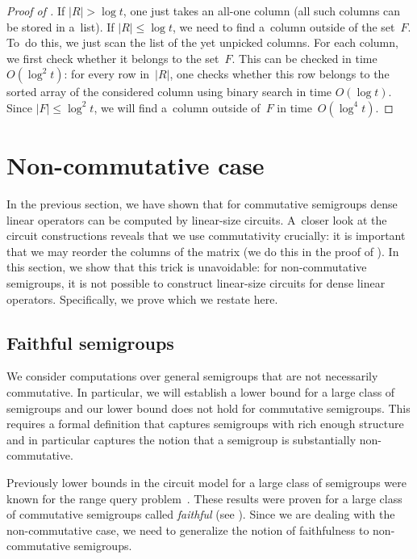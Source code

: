 \documentclass{toc}
\begin{document}
\begin{proof}[Proof of {}]
    If $|R| > \log t$, one just takes an all-one column (all such columns
    can be stored in a~list). If $|R| \le \log t$, we need to find a~column outside
    of the set~$F$. To~do this, we just scan the list of the yet unpicked columns. For
    each column, we first check whether it belongs to the set~$F$. This can be
    checked in time $O(\log^2t)$: for every row in~$|R|$, one checks whether this
    row belongs to the sorted array of the considered column using binary search in
    time $O(\log t)$. Since $|F| \le \log^2t$, we will find a~column outside of~$F$
    in time~$O(\log^4 t)$.

\end{proof}


\section{Non-commutative case}
\label{sec-non-commutative}

In the previous section, we have shown that for commutative semigroups dense
linear operators can be computed by linear-size circuits. A~closer look at the
circuit constructions reveals that we use commutativity crucially: it is
important that we may reorder the columns of the matrix (we do this in the proof
of ). In this section, we show that this trick is
unavoidable: for non-commutative semigroups, it is not possible to construct
linear-size circuits for dense linear operators. %
Specifically,  %
we prove 
which we restate here.  %

\lowerthm*

\subsection{Faithful semigroups}

We consider computations over general semigroups that are not necessarily
commutative. In particular, we will establish a lower bound for a large class of
semigroups and our lower bound does not hold for commutative semigroups. This
requires a formal definition that captures semigroups with rich enough structure
and in particular %
captures the notion   %
that a semigroup is substantially non-commutative.

Previously lower bounds in the circuit model for a large class of semigroups
were known for
the range query
problem~\cite{DBLP:conf/stoc/Yao82,DBLP:journals/ijcga/ChazelleR91}. These
results were proven for a large class of commutative semigroups called
\emph{faithful} (see ). Since we are dealing
with the non-commutative case, we need to generalize the notion of faithfulness
to non-commutative semigroups.
\end{document}
